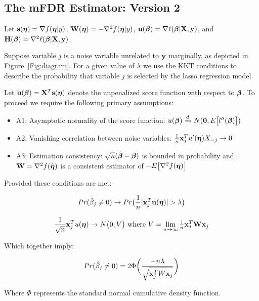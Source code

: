 \subsection{The mFDR Estimator: Version 2}

Let $\mathbf{s}(\boldsymbol{\eta})=\nabla f(\boldsymbol{\eta}|y)$, $\mathbf{W}(\boldsymbol{\eta}) = -\nabla^2 f(\boldsymbol{\eta}|y)$, $\mathbf{u}(\boldsymbol{\beta})=\nabla \ell(\boldsymbol{\beta}|\mathbf{X},\mathbf{y})$, and $\mathbf{H}(\boldsymbol{\beta})=\nabla^2 \ell(\boldsymbol{\beta}|\mathbf{X},\mathbf{y})$.  

Suppose variable $j$ is a noise variable unrelated to $\mathbf{y}$ marginally, as depicted in Figure~\ref{Fig:diagram}. For a given value of $\lambda$ we use the KKT conditions to describe the probability that variable $j$ is selected by the lasso regression model.

Let $\mathbf{u}(\boldsymbol{\beta}) = \mathbf{X}^T \mathbf{s}(\boldsymbol{\eta})$ denote the unpenalized score function with respect to $\boldsymbol{\beta}$.  To proceed we require the following primary assumptions:

\begin{itemize}
\item A1: Asymptotic normality of the score function: $u(\boldsymbol{\beta}) \xrightarrow{d} N(\mathbf{0},  E\big[l''(\boldsymbol{\beta})\big])$
\item A2: Vanishing correlation between noise variables: $\frac{1}{n}\mathbf{x}_j^T u'(\boldsymbol{\eta})X_{-j} \rightarrow 0$
\item A3: Estimation consistency: $\sqrt{n}(\hat{\boldsymbol{\beta}}-  \boldsymbol{\beta})$ is bounded in probability and $\mathbf{W} = \nabla^2 f(\hat{\boldsymbol{\eta}})$ is a consistent estimator of $-E\big[\nabla^2 f(\boldsymbol{\eta})\big]$
\end{itemize}

 Provided these conditions are met:

\begin{equation}
Pr(\hat{\beta}_j \neq 0)  \rightarrow Pr\big(\frac{1}{n}|\mathbf{x}_{j}^T \mathbf{u}(\boldsymbol{\eta})| > \lambda\big)
\end{equation}

\begin{equation}
\frac{1}{\sqrt{n}}\mathbf{x}_{j}^T u(\boldsymbol{\eta}) \rightarrow N\big(0, V\big) 
\text{   where } V = \lim_{n \to \infty} \tfrac{1}{n}\mathbf{x}_{j}^T \mathbf{W} \mathbf{x}_{j}
\end{equation}

Which together imply:

\begin{equation}
Pr(\hat{\beta}_j \neq 0)  = 2\Phi \bigg( \frac{-n\lambda}{\sqrt{ \mathbf{x}_j^TW\mathbf{x}_j}} \bigg)
\end{equation}

Where $\Phi$ represents the standard normal cumulative density function.

